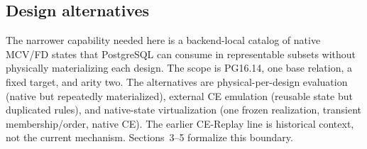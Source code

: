 \subsection{Design alternatives}

The narrower capability needed here is a backend-local catalog of native MCV/FD
states that PostgreSQL can consume in representable subsets without physically
materializing each design.  The scope is PG16.14, one base relation, a fixed
target, and arity two.  The alternatives are
physical-per-design evaluation (native but repeatedly materialized), external
CE emulation (reusable state but duplicated rules), and native-state
virtualization (one frozen realization, transient membership/order, native CE).
The earlier CE-Replay line is historical context, not the current mechanism.
Sections~3--5 formalize this boundary.
